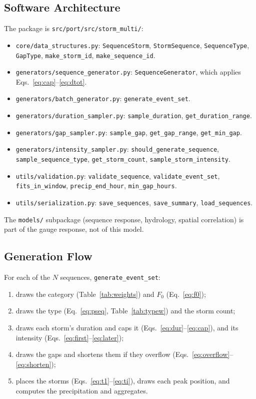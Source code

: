 \documentclass[11pt,a4paper]{article}
\begin{document}
\subsection{Software Architecture}
The package is \texttt{src/port/src/storm\_multi/}:
\begin{itemize}[nosep]
    \item \texttt{core/data\_structures.py}: \texttt{SequenceStorm}, \texttt{StormSequence},
          \texttt{SequenceType}, \texttt{GapType}, \texttt{make\_storm\_id},
          \texttt{make\_sequence\_id}.
    \item \texttt{generators/sequence\_generator.py}: \texttt{SequenceGenerator}, which
          applies Eqs.~\eqref{eq:cap}--\eqref{eq:dtot}.
    \item \texttt{generators/batch\_generator.py}: \texttt{generate\_event\_set}.
    \item \texttt{generators/duration\_sampler.py}: \texttt{sample\_duration},
          \texttt{get\_duration\_range}.
    \item \texttt{generators/gap\_sampler.py}: \texttt{sample\_gap}, \texttt{get\_gap\_range},
          \texttt{get\_min\_gap}.
    \item \texttt{generators/intensity\_sampler.py}: \texttt{should\_generate\_sequence},
          \texttt{sample\_sequence\_type}, \texttt{get\_storm\_count},
          \texttt{sample\_storm\_intensity}.
    \item \texttt{utils/validation.py}: \texttt{validate\_sequence},
          \texttt{validate\_event\_set}, \texttt{fits\_in\_window}, \texttt{precip\_end\_hour},
          \texttt{min\_gap\_hours}.
    \item \texttt{utils/serialization.py}: \texttt{save\_sequences}, \texttt{save\_summary},
          \texttt{load\_sequences}.
\end{itemize}
The \texttt{models/} subpackage (sequence response, hydrology, spatial correlation) is part
of the gauge response, not of this model.

\subsection{Generation Flow}
For each of the $N$ sequences, \texttt{generate\_event\_set}:
\begin{enumerate}[nosep]
    \item draws the category (Table~\ref{tab:weights}) and $F_0$ (Eq.~\eqref{eq:f0});
    \item draws the type (Eq.~\eqref{eq:pseq}, Table~\ref{tab:typew}) and the storm count;
    \item draws each storm's duration and caps it (Eqs.~\eqref{eq:dur}--\eqref{eq:cap}), and
          its intensity (Eqs.~\eqref{eq:first}--\eqref{eq:later});
    \item draws the gaps and shortens them if they overflow
          (Eqs.~\eqref{eq:overflow}--\eqref{eq:shorten});
    \item places the storms (Eqs.~\eqref{eq:t1}--\eqref{eq:ti}), draws each peak position,
          and computes the precipitation and aggregates.
\end{enumerate}
\end{document}
